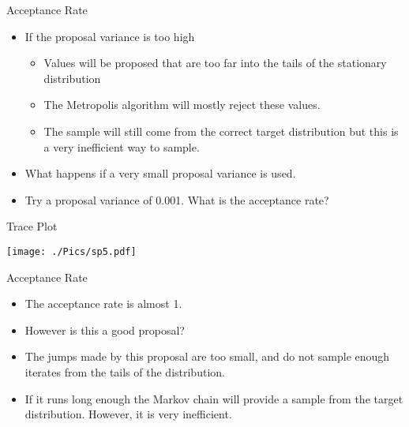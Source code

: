 \documentclass[10pt]{beamer}
\begin{document}
\begin{frame}{Acceptance Rate}
\begin{itemize}
\item If the proposal variance is too high

\begin{itemize}
\item Values will be proposed that are too far into the tails of the stationary distribution

\item The Metropolis algorithm will mostly reject these values.

\item The sample will still come from the  correct target distribution but this is a very inefficient way to sample.
\end{itemize}

\item What happens if a very small proposal variance is used.

\item Try a proposal variance of 0.001. What is the acceptance rate?
\end{itemize}
\end{frame}
\begin{frame}{Trace Plot}
\begin{center}
\texttt{[image: ./Pics/sp5.pdf]}
\end{center}
\end{frame}
\begin{frame}{Acceptance Rate}
\begin{itemize}
\item The acceptance rate is almost 1.

\item However is this a good proposal?

\item The jumps made by this proposal are too small, and do not sample enough iterates from the tails of the distribution.

\item If it runs long enough the Markov chain will provide a sample from the target distribution.  However, it is very inefficient.
\end{itemize}
\end{frame}
\end{document}
